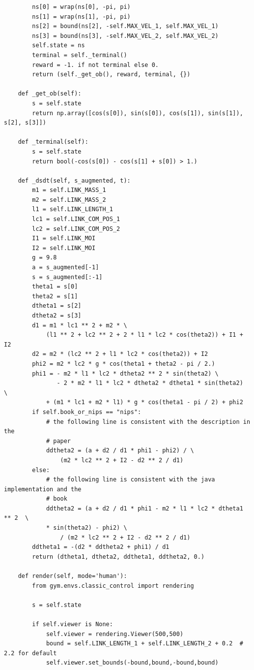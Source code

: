 \documentclass[cic,tc]{iiufrgs}
\newenvironment{longlisting}{\captionsetup{type=listing}}{}
\begin{document}
\begin{longlisting}
\begin{verbatim}
        ns[0] = wrap(ns[0], -pi, pi)
        ns[1] = wrap(ns[1], -pi, pi)
        ns[2] = bound(ns[2], -self.MAX_VEL_1, self.MAX_VEL_1)
        ns[3] = bound(ns[3], -self.MAX_VEL_2, self.MAX_VEL_2)
        self.state = ns
        terminal = self._terminal()
        reward = -1. if not terminal else 0.
        return (self._get_ob(), reward, terminal, {})

    def _get_ob(self):
        s = self.state
        return np.array([cos(s[0]), sin(s[0]), cos(s[1]), sin(s[1]), s[2], s[3]])

    def _terminal(self):
        s = self.state
        return bool(-cos(s[0]) - cos(s[1] + s[0]) > 1.)

    def _dsdt(self, s_augmented, t):
        m1 = self.LINK_MASS_1
        m2 = self.LINK_MASS_2
        l1 = self.LINK_LENGTH_1
        lc1 = self.LINK_COM_POS_1
        lc2 = self.LINK_COM_POS_2
        I1 = self.LINK_MOI
        I2 = self.LINK_MOI
        g = 9.8
        a = s_augmented[-1]
        s = s_augmented[:-1]
        theta1 = s[0]
        theta2 = s[1]
        dtheta1 = s[2]
        dtheta2 = s[3]
        d1 = m1 * lc1 ** 2 + m2 * \
            (l1 ** 2 + lc2 ** 2 + 2 * l1 * lc2 * cos(theta2)) + I1 + I2
        d2 = m2 * (lc2 ** 2 + l1 * lc2 * cos(theta2)) + I2
        phi2 = m2 * lc2 * g * cos(theta1 + theta2 - pi / 2.)
        phi1 = - m2 * l1 * lc2 * dtheta2 ** 2 * sin(theta2) \
               - 2 * m2 * l1 * lc2 * dtheta2 * dtheta1 * sin(theta2)  \
            + (m1 * lc1 + m2 * l1) * g * cos(theta1 - pi / 2) + phi2
        if self.book_or_nips == "nips":
            # the following line is consistent with the description in the
            # paper
            ddtheta2 = (a + d2 / d1 * phi1 - phi2) / \
                (m2 * lc2 ** 2 + I2 - d2 ** 2 / d1)
        else:
            # the following line is consistent with the java implementation and the
            # book
            ddtheta2 = (a + d2 / d1 * phi1 - m2 * l1 * lc2 * dtheta1 ** 2  \
            * sin(theta2) - phi2) \
                / (m2 * lc2 ** 2 + I2 - d2 ** 2 / d1)
        ddtheta1 = -(d2 * ddtheta2 + phi1) / d1
        return (dtheta1, dtheta2, ddtheta1, ddtheta2, 0.)

    def render(self, mode='human'):
        from gym.envs.classic_control import rendering

        s = self.state

        if self.viewer is None:
            self.viewer = rendering.Viewer(500,500)
            bound = self.LINK_LENGTH_1 + self.LINK_LENGTH_2 + 0.2  # 2.2 for default
            self.viewer.set_bounds(-bound,bound,-bound,bound)


\end{verbatim}
\end{longlisting}
\end{document}
